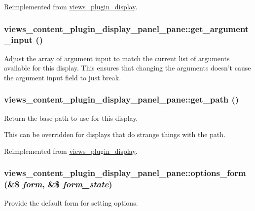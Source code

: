 Reimplemented from \hyperlink{classviews__plugin__display_a47058532874d0bc5448b53e0a98489cc}{views\_\-plugin\_\-display}.\hypertarget{classviews__content__plugin__display__panel__pane_acde0ff3c4cbb95f59c011bc7b26c143e}{
\subsubsection[{get\_\-argument\_\-input}]{\setlength{\rightskip}{0pt plus 5cm}views\_\-content\_\-plugin\_\-display\_\-panel\_\-pane::get\_\-argument\_\-input ()}}
\label{classviews__content__plugin__display__panel__pane_acde0ff3c4cbb95f59c011bc7b26c143e}
Adjust the array of argument input to match the current list of arguments available for this display. This ensures that changing the arguments doesn't cause the argument input field to just break. \hypertarget{classviews__content__plugin__display__panel__pane_a363668d682a3d3489aef9df3adcbc7b7}{
\subsubsection[{get\_\-path}]{\setlength{\rightskip}{0pt plus 5cm}views\_\-content\_\-plugin\_\-display\_\-panel\_\-pane::get\_\-path ()}}
\label{classviews__content__plugin__display__panel__pane_a363668d682a3d3489aef9df3adcbc7b7}
Return the base path to use for this display.

This can be overridden for displays that do strange things with the path. 

Reimplemented from \hyperlink{classviews__plugin__display_ac9a045f84e31fbe0513482170bd61c01}{views\_\-plugin\_\-display}.\hypertarget{classviews__content__plugin__display__panel__pane_a9ae46f16b092629f3222cd0e0f65d0f9}{
\subsubsection[{options\_\-form}]{\setlength{\rightskip}{0pt plus 5cm}views\_\-content\_\-plugin\_\-display\_\-panel\_\-pane::options\_\-form (\&\$ {\em form}, \/  \&\$ {\em form\_\-state})}}
\label{classviews__content__plugin__display__panel__pane_a9ae46f16b092629f3222cd0e0f65d0f9}
Provide the default form for setting options. 

